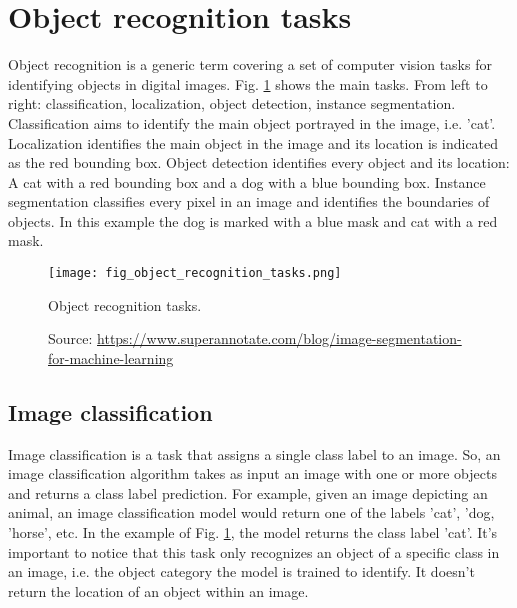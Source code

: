 \section{Object recognition tasks}
Object recognition is a generic term covering a set of computer vision tasks for identifying objects in digital images. Fig. \ref{fig:object_recognition_tasks} shows the main tasks. From left to right: classification, localization, object detection, instance segmentation. Classification aims to identify the main object portrayed in the image, i.e. 'cat'. Localization identifies the main object in the image and its location is indicated as the red bounding box. Object detection identifies every object and its location: A cat with a red bounding box and a dog with a blue bounding box. Instance segmentation classifies every pixel in an image and identifies the boundaries of objects. In this example the dog is marked with a blue mask and cat with a red mask.
\begin{figure}[ht]
    \begin{center}
    \texttt{[image: fig\_object\_recognition\_tasks.png]}
    \caption[Object recognition tasks]{
    Object recognition tasks.}
    \caption*{
    Source: \href{https://www.superannotate.com/blog/image-segmentation-for-machine-learning}{https://www.superannotate.com/blog/image-segmentation-for-machine-learning}}
    \label{fig:object_recognition_tasks}
    \end{center}
\end{figure}

\subsection{Image classification}
Image classification is a task that assigns a single class label to an image. So, an image classification algorithm takes as input an image with one or more objects and returns a class label prediction. For example, given an image depicting an animal, an image classification model would return one of the labels 'cat', 'dog, 'horse', etc. In the example of Fig. \ref{fig:object_recognition_tasks}, the model returns the class label 'cat'. It's important to notice that this task only recognizes an object of a specific class in an image, i.e. the object category the model is trained to identify. It doesn't return the location of an object within an image.

